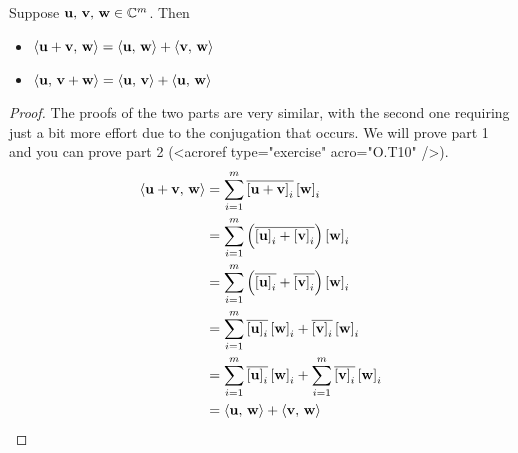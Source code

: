 \documentclass{ximera}
\begin{document}
\begin{theorem}
  \label{theorem:IPVA}
  
  Suppose $\mathbf{u},\,\mathbf{v},\,\mathbf{w}\in\mathbb{C}^{m}$.  Then
  \begin{itemize}
  \item $\left\langle\mathbf{u}+\mathbf{v},\,\mathbf{w}\right\rangle=\left\langle\mathbf{u},\,\mathbf{w}\right\rangle+\left\langle\mathbf{v},\,\mathbf{w}\right\rangle$
  \item $\left\langle\mathbf{u},\,\mathbf{v}+\mathbf{w}\right\rangle=\left\langle\mathbf{u},\,\mathbf{v}\right\rangle+\left\langle\mathbf{u},\,\mathbf{w}\right\rangle$
  \end{itemize}

  \begin{proof}
    The proofs of the two parts are very similar, with the second one requiring just a bit more effort due to the conjugation that occurs.  We will prove part 1 and you can prove part 2 (<acroref type="exercise" acro="O.T10" />).
    \begin{align*}
      \innerproduct{\vect{u}+\vect{v}}{\vect{w}}
      &=\sum_{i=1}^{m}\conjugate{\vectorentry{\vect{u}+\vect{v}}{i}}\vectorentry{\vect{w}}{i}
      \\ %
      &=\sum_{i=1}^{m}\left(\conjugate{\vectorentry{\vect{u}}{i}+
        \vectorentry{\vect{v}}{i}}\right)\vectorentry{\vect{w}}{i}
      \\ %
      &=\sum_{i=1}^{m}\left(\conjugate{\vectorentry{\vect{u}}{i}}+
        \conjugate{\vectorentry{\vect{v}}{i}}\right)\vectorentry{\vect{w}}{i}
      \\ %
      &=\sum_{i=1}^{m}\conjugate{\vectorentry{\vect{u}}{i}}\vectorentry{\vect{w}}{i}
        + \conjugate{\vectorentry{\vect{v}}{i}}\vectorentry{\vect{w}}{i}
      \\ %
      &=\sum_{i=1}^{m}\conjugate{\vectorentry{\vect{u}}{i}}\vectorentry{\vect{w}}{i}
        +\sum_{i=1}^{m}\conjugate{\vectorentry{\vect{v}}{i}}\vectorentry{\vect{w}}{i}
      \\ %
      &=\innerproduct{\vect{u}}{\vect{w}}+\innerproduct{\vect{v}}{\vect{w}} %
    \end{align*}
\end{proof}
\end{theorem}
\end{document}
